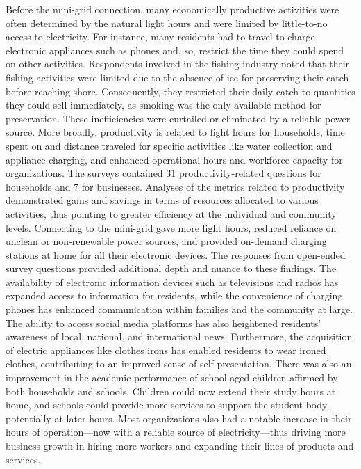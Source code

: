 Before the mini-grid connection, many economically productive activities were often determined by the natural light hours and were limited by little-to-no access to electricity. For instance, many residents had to travel to charge electronic appliances such as phones and, so, restrict the time they could spend on other activities.
Respondents involved in the fishing industry noted that their fishing activities were limited due to the absence of ice for preserving their catch before reaching shore. Consequently, they restricted their daily catch to quantities they could sell immediately, as smoking was the only available method for preservation.
These inefficiencies were curtailed or eliminated by a reliable power source. More broadly, productivity is related to light hours for households, time spent on and distance traveled for specific activities like water collection and appliance charging, and enhanced operational hours and workforce capacity for organizations. The surveys contained 31 productivity-related questions for households and 7 for businesses. Analyses of the metrics related to productivity demonstrated gains and savings in terms of resources allocated to various activities, thus pointing to greater efficiency at the individual and community levels. Connecting to the mini-grid gave more light hours, reduced reliance on unclean or non-renewable power sources, and provided on-demand charging stations at home for all their electronic devices.
The responses from open-ended survey questions provided additional depth and nuance to these findings. The availability of electronic information devices such as televisions and radios has expanded access to information for residents, while the convenience of charging phones has enhanced communication within families and the community at large. The ability to access social media platforms has also heightened residents' awareness of local, national, and international news. Furthermore, the acquisition of electric appliances like clothes irons has enabled residents to wear ironed clothes, contributing to an improved sense of self-presentation.
There was also an improvement in the academic performance of school-aged children affirmed by both households and schools. Children could now extend their study hours at home, and schools could provide more services to support the student body, potentially at later hours. Most organizations also had a notable increase in their hours of operation---now with a reliable source of electricity---thus driving more business growth in hiring more workers and expanding their lines of products and services.

